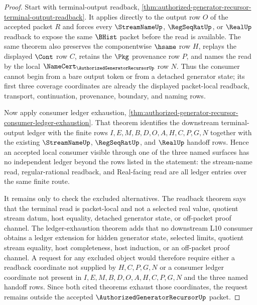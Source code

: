 \begin{proof}
Start with terminal-output readback, \autoref{thm:authorized-generator-recursor-terminal-output-readback}. It applies directly to the output row $O$ of the accepted packet $R$ and forces every $\StreamNameUp$, $\RegSeqRatUp$, or $\RealUp$ readback to expose the same $\BHist$ packet before the read is available. The same theorem also preserves the componentwise $\hsame$ row $H$, replays the displayed $\Cont$ row $C$, retains the $\Pkg$ provenance row $P$, and names the read by the local $\NameCert_{\AuthorizedGeneratorRecursorUp}$ row $N$. Thus the consumer cannot begin from a bare output token or from a detached generator state; its first three coverage coordinates are already the displayed packet-local readback, transport, continuation, provenance, boundary, and naming rows.

Now apply consumer ledger exhaustion, \autoref{thm:authorized-generator-recursor-consumer-ledger-exhaustion}. That theorem identifies the downstream terminal-output ledger with the finite rows $I,E,M,B,D,O,A,H,C,P,G,N$ together with the existing $\StreamNameUp$, $\RegSeqRatUp$, and $\RealUp$ handoff rows. Hence an accepted local consumer visible through one of the three named surfaces has no independent ledger beyond the rows listed in the statement: the stream-name read, regular-rational readback, and Real-facing read are all ledger entries over the same finite route.

It remains only to check the excluded alternatives. The readback theorem says that the terminal read is packet-local and not a selected real value, quotient stream datum, host equality, detached generator state, or off-packet proof channel. The ledger-exhaustion theorem adds that no downstream L10 consumer obtains a ledger extension for hidden generator state, selected limits, quotient stream equality, host completeness, host induction, or an off-packet proof channel. A request for any excluded object would therefore require either a readback coordinate not supplied by $H,C,P,G,N$ or a consumer ledger coordinate not present in $I,E,M,B,D,O,A,H,C,P,G,N$ and the three named handoff rows. Since both cited theorems exhaust those coordinates, the request remains outside the accepted $\AuthorizedGeneratorRecursorUp$ packet.
\end{proof}
